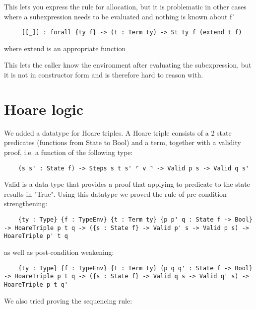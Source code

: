 \documentclass{article}
\begin{document}
This lets you express the rule for allocation, but it is problematic
in other cases where a subexpression needs to be evaluated and
nothing is known about f'


\begin{lstlisting}
     [[_]] : forall {ty f} -> (t : Term ty) -> St ty f (extend t f)
\end{lstlisting}
where extend is an appropriate function

This lets the caller know the environment after evaluating the
subexpression, but it is not in constructor form and is therefore
hard to reason with.

\section{Hoare logic}

We added a datatype for Hoare triples. A Hoare triple consists of a 2 state predicates (functions from State to Bool) and a term, together with a validity proof, i.e. a function of the following type:

\begin{lstlisting}
	(s s' : State f) -> Steps s t s' ⌜ v ⌝ -> Valid p s -> Valid q s'
\end{lstlisting}

Valid is a data type that provides a proof that applying to predicate to the state results in "True". Using this datatype we proved the rule of pre-condition strengthening:

\begin{lstlisting}
	{ty : Type} {f : TypeEnv} {t : Term ty} {p p' q : State f -> Bool} -> HoareTriple p t q -> ({s : State f} -> Valid p' s -> Valid p s) -> HoareTriple p' t q
\end{lstlisting}

as well as post-condition weakening:

\begin{lstlisting}
	{ty : Type} {f : TypeEnv} {t : Term ty} {p q q' : State f -> Bool} -> HoareTriple p t q -> ({s : State f} -> Valid q s -> Valid q' s) -> HoareTriple p t q'
\end{lstlisting}

We also tried proving the sequencing rule:
\end{document}
